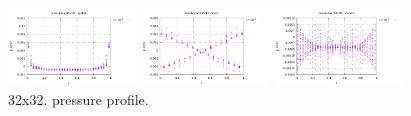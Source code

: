\begin{center}
\includegraphics[width=3.4cm]{python_codes/fieldstone_115/results/dh/pressure_global_error.pdf}
\includegraphics[width=3.4cm]{python_codes/fieldstone_115/results/dh/pressure_local_error.pdf}
\includegraphics[width=3.4cm]{python_codes/fieldstone_115/results/dh/pressure_macro_error.pdf}\\
{\captionfont 32x32. pressure profile.} 
\end{center}

